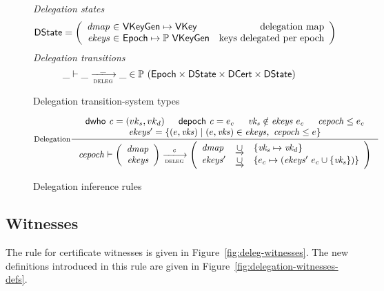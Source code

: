 \documentclass[11pt,a4paper]{article}
\newcommand{\powerset}[1]{\mathbb{P}~#1}
\newcommand{\unionoverride}{\mathbin{\underrightarrow\cup}}
\newcommand{\var}[1]{\mathit{#1}}
\newcommand{\fun}[1]{\mathsf{#1}}
\newcommand{\type}[1]{\mathsf{#1}}
\newcommand{\trans}[2]{\xlongrightarrow[\textsc{#1}]{#2}}
\newcommand{\VKey}{\type{VKey}}
\newcommand{\DCert}{\type{DCert}}
\newcommand{\DState}{\type{DState}}
\newcommand{\Epoch}{\type{Epoch}}
\newcommand{\VKeyGen}{\type{VKeyGen}}
\newcommand{\dwho}[1]{\fun{dwho}~\var{#1}}
\newcommand{\depoch}[1]{\fun{depoch}~\var{#1}}
\begin{document}
\begin{figure}
  \emph{Delegation states}
  \begin{align*}
    & \DState
      = \left(
        \begin{array}{r@{~\in~}lr}
          \var{dmap} & \VKeyGen \mapsto \VKey & \text{delegation map}\\
          \var{ekeys} & \Epoch \mapsto \powerset{\VKeyGen} & \text{keys delegated per epoch}
        \end{array}\right)
  \end{align*}
  \emph{Delegation transitions}
  \begin{equation*}
    \_ \vdash \_ \trans{deleg}{\_} \_ \in
      \powerset (\Epoch \times \DState \times \DCert \times \DState)
    \end{equation*}
  \caption{Delegation transition-system types}
  \label{fig:delegation-ts-types}
\end{figure}

\begin{figure}
  \begin{equation}\label{eq:delegation}
    \inference[Delegation]
    {\dwho{c} = (vk_s, vk_d) & \depoch{c} = e_c & \var{vk_s} \notin \var{ekeys}~e_c & \var{cepoch} \leq e_c\\
      \var{ekeys'} = \{ (e, \var{vks})  \mid (e, \var{vks}) \in \var{ekeys},~  \var{cepoch} \leq e \}
    }
    {
      \var{cepoch} \vdash
      \left(
      \begin{array}{r}
        \var{dmap}\\
        \var{ekeys}
      \end{array}
      \right)
      \trans{deleg}{c}
      \left(
      \begin{array}{lcl}
        \var{dmap} & \unionoverride & \{\var{vk_s} \mapsto \var{vk_d}\}\\
        \var{ekeys'} & \unionoverride & \{e_c \mapsto (\var{ekeys'}~e_c \cup \{\var{vk_s}\})\}
      \end{array}
      \right)
    }
  \end{equation}
  \caption{Delegation inference rules}
  \label{fig:state-trans-delegation}
\end{figure}

\subsection{Witnesses}
\label{sec:delegation-witnesses}

The rule for certificate witnesses is given in
Figure~\ref{fig:deleg-witnesses}. The new definitions introduced in this rule
are given in Figure~\ref{fig:delegation-witnesses-defs}.
\end{document}
